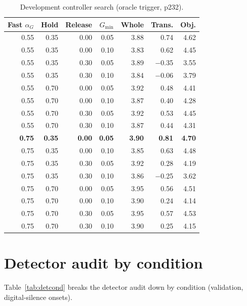 \documentclass[10pt,conference,a4paper]{IEEEtran}
\begin{document}
\begin{table}[h]
\centering
\caption{Development controller search (oracle trigger, p232).}
\label{tab:search}
\scriptsize
\begin{tabular}{@{}rrrrrrr@{}}
\toprule
Fast $\alpha_G$ & Hold & Release & $G_{\min}$ & Whole & Trans. & Obj.\\
\midrule
0.55 & 0.35 & 0.00 & 0.05 & 3.88 & 0.74 & 4.62\\
0.55 & 0.35 & 0.00 & 0.10 & 3.83 & 0.62 & 4.45\\
0.55 & 0.35 & 0.30 & 0.05 & 3.89 & $-$0.35 & 3.55\\
0.55 & 0.35 & 0.30 & 0.10 & 3.84 & $-$0.06 & 3.79\\
0.55 & 0.70 & 0.00 & 0.05 & 3.92 & 0.48 & 4.41\\
0.55 & 0.70 & 0.00 & 0.10 & 3.87 & 0.40 & 4.28\\
0.55 & 0.70 & 0.30 & 0.05 & 3.92 & 0.53 & 4.45\\
0.55 & 0.70 & 0.30 & 0.10 & 3.87 & 0.44 & 4.31\\
\textbf{0.75} & \textbf{0.35} & \textbf{0.00} & \textbf{0.05} & \textbf{3.90} & \textbf{0.81} & \textbf{4.70}\\
0.75 & 0.35 & 0.00 & 0.10 & 3.85 & 0.63 & 4.48\\
0.75 & 0.35 & 0.30 & 0.05 & 3.92 & 0.28 & 4.19\\
0.75 & 0.35 & 0.30 & 0.10 & 3.86 & $-$0.25 & 3.62\\
0.75 & 0.70 & 0.00 & 0.05 & 3.95 & 0.56 & 4.51\\
0.75 & 0.70 & 0.00 & 0.10 & 3.90 & 0.24 & 4.14\\
0.75 & 0.70 & 0.30 & 0.05 & 3.95 & 0.57 & 4.53\\
0.75 & 0.70 & 0.30 & 0.10 & 3.90 & 0.25 & 4.15\\
\bottomrule
\end{tabular}
\end{table}

\section{Detector audit by condition}
\label{app:detector}
Table~\ref{tab:detcond} breaks the detector audit down by condition
(validation, digital-silence onsets).
\end{document}
